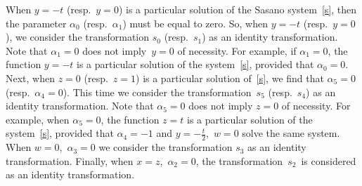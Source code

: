 \documentclass[10pt,a4paper]{amsart}
\numberwithin{equation}{section}
\begin{document}
 \begin{Remark}\label{tr}
 When $y=-t$ (resp.\ $y=0$) is a particular solution of the Sasano system~\eqref{s}, then the parameter
 $\alpha_0$ (resp.\ $\alpha_1$) must be equal to zero. So, when $y=-t$ (resp.\ $y=0$), we consider the
 transformation $s_0$ (resp.\ $s_1$) as an identity transformation.
 Note that $\alpha_1=0$ does not imply~${y=0}$ of necessity.
 For example, if $\alpha_1=0$, the function $y=-t$ is a particular solution of the system~\eqref{s}, provided that
 $\alpha_0=0$.
 Next, when $z=0$ (resp.\ $z=1$) is a particular solution of~\eqref{s}, we find that $\alpha_5=0$ (resp.\ $\alpha_4=0$).
 This time we consider the transformation~$s_5$ (resp.~$s_4$) as an identity transformation.
 Note that $\alpha_5=0$ does not imply $z=0$ of necessity. For example, when $\alpha_5=0$, the function
 $z=t$ is a particular solution of the system~\eqref{s}, provided that $\alpha_4=-1$ and $y=-\frac{t}{2}$,~$w=0$ solve
 the same system. When $w=0$,~$\alpha_3=0$ we consider the transformation $s_3$ as an identity transformation.
 Finally, when $x=z$,~$\alpha_2=0$,
 the transformation~$s_2$~is considered as an identity transformation.
 \end{Remark}
\end{document}

